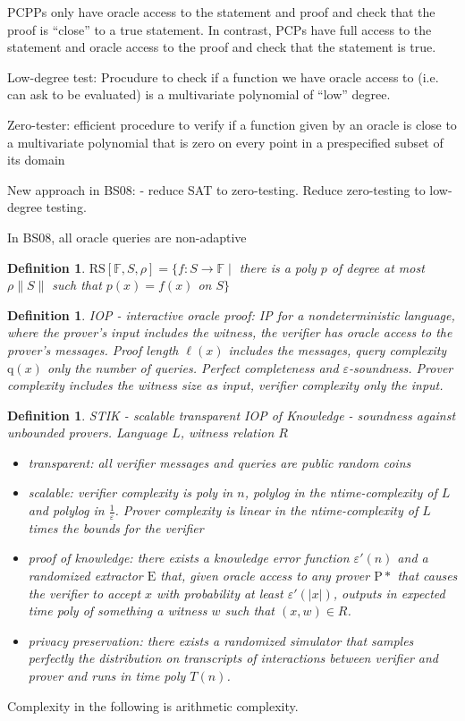 \documentclass[11pt,letterpaper]{article}
\newtheorem{definition}[dummytheorem]{Definition}
\newcommand{\eps}{\varepsilon}
\begin{document}
PCPPs only have oracle access to the statement and proof and check that the proof is ``close'' to a true statement.
In contrast, PCPs have full access to the statement and oracle access to the proof and check that the statement is true.

Low-degree test: Procudure to check if a function we have oracle access to (i.e. can ask to be evaluated) is a multivariate polynomial of ``low'' degree.

Zero-tester: efficient procedure to verify if a function given by an oracle is close to a multivariate polynomial that is
zero on every point in a prespecified subset of its domain

New approach in BS08:
 - reduce SAT to zero-testing. Reduce zero-testing to low-degree testing.

In BS08, all oracle queries are non-adaptive

\begin{definition}
$\mathrm{RS}[\mathbb{F}, S, \rho] = \{ f \colon S \to \mathbb{F} \mid $
there is a poly $p$ of degree at most $\rho\|S\|$ such that $p(x)=f(x)$ on $S \}$
\end{definition}

\begin{definition}
IOP - interactive oracle proof: IP for a nondeterministic language, where the prover's input includes the witness, the verifier
has oracle access to the prover's messages. Proof length $\ell(x)$ includes the messages, query complexity $\mathrm{q}(x)$ only
the number of queries. Perfect completeness and $\eps$-soundness.
Prover complexity includes the witness size as input, verifier complexity only the input.
\end{definition}


\begin{definition}
STIK - scalable transparent IOP of Knowledge - soundness against unbounded provers.
Language $L$, witness relation $R$
\begin{itemize}
\item transparent: all verifier messages and queries are public random coins
\item scalable: verifier complexity is poly in $n$, polylog in the ntime-complexity of $L$ and polylog in $\frac{1}{\varepsilon}$.
Prover complexity is linear in the ntime-complexity of $L$ times the bounds for the verifier
\item proof of knowledge: there exists a knowledge error function $\varepsilon'(n)$ and a randomized extractor $\mathrm{E}$ that,
given oracle access to any prover $\mathrm{P}*$ that causes the verifier to accept $x$ with probability at least $\varepsilon'(|x|)$,
outputs in expected time poly of something a witness $w$ such that $(x,w) \in R$.
\item privacy preservation: there exists a randomized simulator that samples perfectly the distribution
on transcripts of interactions between verifier and prover and runs in time poly $T(n)$.
\end{itemize}
\end{definition}

Complexity in the following is arithmetic complexity.
\end{document}

